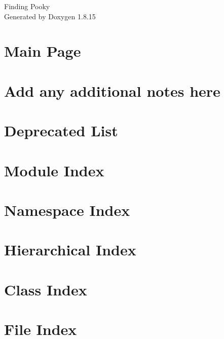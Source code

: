 \let\mypdfximage\pdfximage\def\pdfximage{\immediate\mypdfximage}\documentclass[twoside]{book}
\newcommand{\+}{\discretionary{\mbox{\scriptsize$\hookleftarrow$}}{}{}}
\newcommand{\clearemptydoublepage}{%
  \newpage{\pagestyle{empty}\cleardoublepage}%
}
\begin{document}
\hypersetup{pageanchor=false,
             bookmarksnumbered=true,
             pdfencoding=unicode
            }
\begin{titlepage}
\vspace*{7cm}
\begin{center}%
{\Large Finding Pooky }\\
\vspace*{1cm}
{\large Generated by Doxygen 1.8.15}\\
\end{center}
\end{titlepage}
\clearemptydoublepage
{}
\tableofcontents
\clearemptydoublepage
{}
\hypersetup{pageanchor=true}

\chapter{Main Page}
\label{index}\hypertarget{index}{}
\chapter{Add any additional notes here}
\label{md__r_e_a_d_m_e}

\chapter{Deprecated List}
\label{deprecated}

\chapter{Module Index}

\chapter{Namespace Index}

\chapter{Hierarchical Index}

\chapter{Class Index}

\chapter{File Index}

\end{document}
